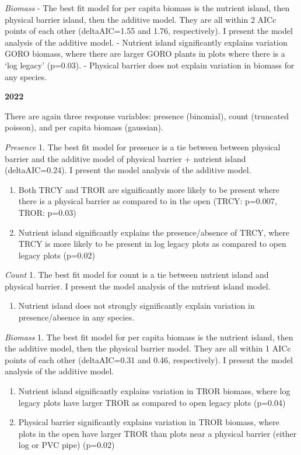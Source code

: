 \documentclass[
]{article}
\providecommand{\tightlist}{%
  \setlength{\itemsep}{0pt}\setlength{\parskip}{0pt}}
\begin{document}
\emph{Biomass} - The best fit model for per capita biomass is the
nutrient island, then physical barrier island, then the additive model.
They are all within 2 AICc points of each other (deltaAIC=1.55 and 1.76,
respectively). I present the model analysis of the additive model. -
Nutrient island significantly explains variation GORO biomass, where
there are larger GORO plants in plots where there is a `log legacy'
(p=0.03). - Physical barrier does not explain variation in biomass for
any species.

\textbf{2022}

There are again three response variables: presence (binomial), count
(truncated poisson), and per capita biomass (gaussian).

\emph{Presence} 1. The best fit model for presence is a tie between
between physical barrier and the additive model of physical barrier +
nutrient island (deltaAIC=0.24). I present the model analysis of the
additive model.

\begin{enumerate}
\def\labelenumi{\arabic{enumi}.}
\setcounter{enumi}{1}
\item
  Both TRCY and TROR are significantly more likely to be present where
  there is a physical barrier as compared to in the open (TRCY: p=0.007,
  TROR: p=0.03)
\item
  Nutrient island significantly explains the presence/absence of TRCY,
  where TRCY is more likely to be present in log legacy plots as
  compared to open legacy plots (p=0.02)
\end{enumerate}

\emph{Count} 1. The best fit model for count is a tie between nutrient
island and physical barrier. I present the model analysis of the
nutrient island model.

\begin{enumerate}
\def\labelenumi{\arabic{enumi}.}
\setcounter{enumi}{1}
\tightlist
\item
  Nutrient island does not strongly significantly explain variation in
  presence/absence in any species.
\end{enumerate}

\emph{Biomass} 1. The best fit model for per capita biomass is the
nutrient island, then the additive model, then the physical barrier
model. They are all within 1 AICc points of each other (deltaAIC=0.31
and 0.46, respectively). I present the model analysis of the additive
model.

\begin{enumerate}
\def\labelenumi{\arabic{enumi}.}
\setcounter{enumi}{1}
\item
  Nutrient island significantly explains variation in TROR biomass,
  where log legacy plots have larger TROR as compared to open legacy
  plots (p=0.04)
\item
  Physical barrier significantly explains variation in TROR biomass,
  where plots in the open have larger TROR than plots near a physical
  barrier (either log or PVC pipe) (p=0.02)
\end{enumerate}
\end{document}
